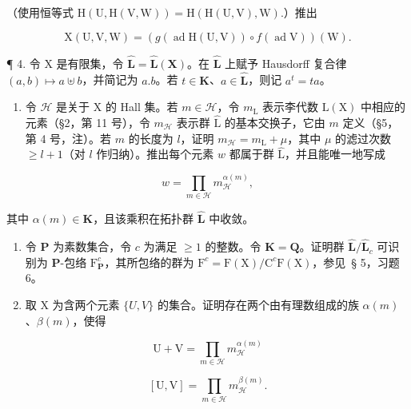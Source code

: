 （使用恒等式 \(\mathrm{H}(\mathrm{U},\mathrm{H}(\mathrm{V},\mathrm{W})) = \mathrm{H}(\mathrm{H}(\mathrm{U},\mathrm{V}),\mathrm{W}).\)）推出

\[
\mathrm{X} (\mathrm{U}, \mathrm{V}, \mathrm{W}) = (g (\operatorname{ad} \mathrm{H} (\mathrm{U}, \mathrm{V})) \circ f (\operatorname{ad} \mathrm{V})) (\mathrm{W}).
\]

¶ 4. 令 X 是有限集，令 \(\hat{\mathbf{L}} = \hat{\mathbf{L}}(\mathbf{X})\)。在 \(\hat{\mathbf{L}}\) 上赋予 Hausdorff 复合律 \((a, b) \mapsto a \uplus b\)，并简记为 \(a.b\)。若 \(t \in \mathbf{K}\)、\(a \in \hat{\mathbf{L}}\)，则记 \(a^t = t a\)。

\begin{enumerate}
\def\labelenumi{(\alph{enumi})}
\tightlist
\item
  令 \(\mathcal{H}\) 是关于 X 的 Hall 集。若 \(m \in \mathcal{H}\)，令 \(m_{\mathrm{L}}\) 表示李代数 \(\mathrm{L}(\mathrm{X})\) 中相应的元素（§2，第 11 号），令 \(m_{\mathcal{H}}\) 表示群 \(\hat{\mathrm{L}}\) 的基本交换子，它由 \(m\) 定义（§5，第 4 号，注）。若 \(m\) 的长度为 \(l\)，证明 \(m_{\mathcal{H}} = m_{\mathrm{L}} + \mu\)，其中 \(\mu\) 的滤过次数 \(\geqslant l + 1\)（对 \(l\) 作归纳）。推出每个元素 \(w\) 都属于群 \(\hat{\mathrm{L}}\)，并且能唯一地写成
\end{enumerate}

\[
w = \prod_ {m \in \mathcal {H}} m _ {\mathcal {H}} ^ {\alpha (m)},
\]


其中 \(\alpha(m) \in \mathbf{K}\)，且该乘积在拓扑群 \(\hat{\mathbf{L}}\) 中收敛。

\begin{enumerate}
\def\labelenumi{(\alph{enumi})}
\setcounter{enumi}{1}
\item
  令 \(\mathbf{P}\) 为素数集合，令 \(c\) 为满足 \(\geqslant 1\) 的整数。令 \(\mathbf{K} = \mathbf{Q}\)。证明群 \(\hat{\mathbf{L}} / \hat{\mathbf{L}}_c\) 可识别为 \(\mathbf{P}\)-包络 \(\mathrm{F}_{\mathbf{P}}^{c}\)，其所包络的群为 \(\mathrm{F}^c = \mathrm{F}(\mathrm{X}) / \mathrm{C}^c\mathrm{F}(\mathrm{X})\)，参见~§ 5，习题 6。
\item
  取 X 为含两个元素 \(\{U, V\}\) 的集合。证明存在两个由有理数组成的族 \(\alpha(m)\)、\(\beta(m)\)，使得
\end{enumerate}

\[
\mathrm{U} + \mathrm{V} = \prod_ {m \in \mathcal {H}} m _ {\mathcal {H}} ^ {\alpha (m)}
\]

\[
[ \mathrm{U}, \mathrm{V} ] = \prod_ {m \in \mathcal {H}} m _ {\mathcal {H}} ^ {\beta (m)}.
\]

